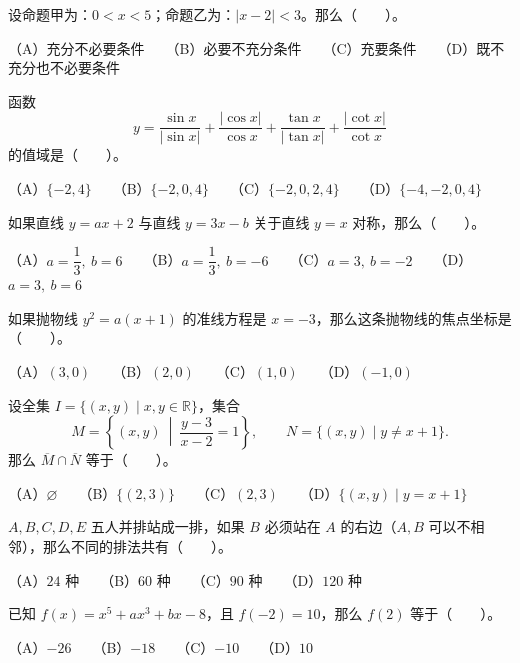 \begin{question}
设命题甲为：$0<x<5$；命题乙为：$|x-2|<3$。那么\mbox{（　　）}。

（A）充分不必要条件　　（B）必要不充分条件　　（C）充要条件　　（D）既不充分也不必要条件

\end{question}
\begin{question}
函数
\nopagebreak[4]
\[
y=\frac{\sin x}{|\sin x|}+\frac{|\cos x|}{\cos x}+\frac{\tan x}{|\tan x|}+\frac{|\cot x|}{\cot x}
\]
的值域是\mbox{（　　）}。

（A）$\{-2,4\}$　　（B）$\{-2,0,4\}$　　（C）$\{-2,0,2,4\}$　　（D）$\{-4,-2,0,4\}$

\end{question}
\begin{question}
如果直线 $y=ax+2$ 与直线 $y=3x-b$ 关于直线 $y=x$ 对称，那么\mbox{（　　）}。

（A）$a=\dfrac13,\ b=6$　　（B）$a=\dfrac13,\ b=-6$　　（C）$a=3,\ b=-2$　　（D）$a=3,\ b=6$

\end{question}
\begin{question}
如果抛物线 $y^2=a(x+1)$ 的准线方程是 $x=-3$，那么这条抛物线的焦点坐标是\mbox{（　　）}。

（A）$(3,0)$　　（B）$(2,0)$　　（C）$(1,0)$　　（D）$(-1,0)$

\end{question}
\begin{question}
设全集 $I=\{(x,y)\mid x,y\in\mathbb R\}$，集合
\nopagebreak[4]
\[
M=\left\{(x,y)\ \middle|\ \frac{y-3}{x-2}=1\right\},\qquad
N=\{(x,y)\mid y\ne x+1\}.
\]
那么 $\overline M\cap\overline N$ 等于\mbox{（　　）}。

（A）$\varnothing$　　（B）$\{(2,3)\}$　　（C）$(2,3)$　　（D）$\{(x,y)\mid y=x+1\}$

\end{question}
\begin{question}
$A,B,C,D,E$ 五人并排站成一排，如果 $B$ 必须站在 $A$ 的右边（$A,B$ 可以不相邻），那么不同的排法共有\mbox{（　　）}。

（A）$24$ 种　　（B）$60$ 种　　（C）$90$ 种　　（D）$120$ 种

\end{question}
\begin{question}
已知 $f(x)=x^5+ax^3+bx-8$，且 $f(-2)=10$，那么 $f(2)$ 等于\mbox{（　　）}。

（A）$-26$　　（B）$-18$　　（C）$-10$　　（D）$10$

\Needspace{0.4\textheight}
\end{question}

